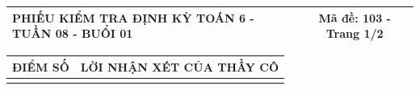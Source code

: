 \documentclass[12pt,a4paper]{article}
\begin{document}
\newpage


\noindent
\begin{tabularx}{\linewidth}{|X|c|}
\hline
\textbf{PHIẾU KIỂM TRA ĐỊNH KỲ TOÁN 6 - TUẦN 08 - BUỔI 01} & \textbf{Mã đề: 103 - Trang 1/2} \\
\hline
\end{tabularx}

\vspace{1mm}

\noindent
\begin{tabularx}{\linewidth}{|p{3.2cm}|X|}
\hline
\centering\textbf{ĐIỂM SỐ} & \centering\textbf{LỜI NHẬN XÉT CỦA THẦY CÔ} \tabularnewline
\hline
\rule{0pt}{1.8cm} & \tabularnewline
\hline
\end{tabularx}

\vspace{1.2mm}
\end{document}
